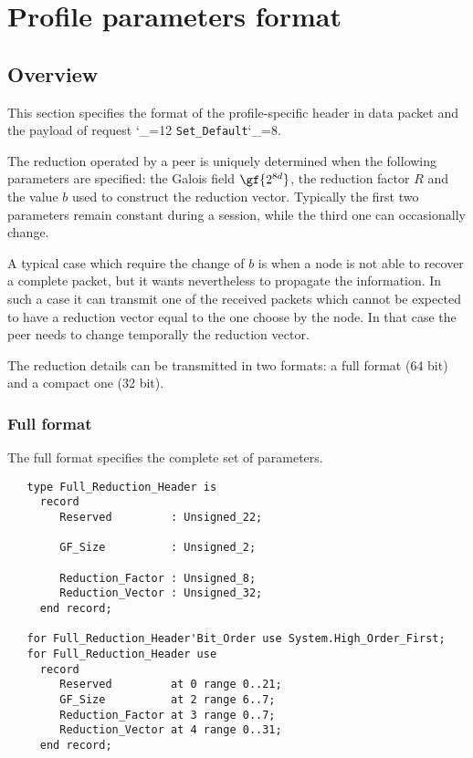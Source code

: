 \documentclass{rfc}
\def\ttt{\catcode`\_=12 \tttii}
\def\tttii#1!{{\tt #1}\catcode`\_=8{}}
\begin{document}
\section{Profile parameters format}
\label{subsub:0.1.1.1;driver}

\subsection{Overview}
\label{sub:0.1.1.1.0;transport_layer}

This section specifies the format of the profile-specific header in
data packet and the payload of request \ttt Set_Default!.

The reduction operated by a peer is uniquely determined when the
following parameters are specified: the Galois field $\gf{2^{8d}}$,
the reduction factor $R$ and the value $b$ used to construct the
reduction vector.  Typically the first two parameters remain constant
during a session, while the third one can occasionally change.

\begin{example}
A typical case which require the change of $b$ is when a node is not
able to recover a complete packet, but it wants nevertheless to
propagate the information.  In such a case it can transmit one of the
received packets which cannot be expected to have a reduction vector
equal to the one choose by the node.  In that case the peer needs to
change temporally the reduction vector.
\end{example}
%
The reduction details can be transmitted in two formats: a full format
(64 bit) and a compact one (32 bit).  

\subsubsection{Full format} The full format specifies the complete set of
parameters. 

\begin{verbatim}
   type Full_Reduction_Header is
     record
        Reserved         : Unsigned_22;

        GF_Size          : Unsigned_2;

        Reduction_Factor : Unsigned_8;
        Reduction_Vector : Unsigned_32;
     end record;

   for Full_Reduction_Header'Bit_Order use System.High_Order_First;
   for Full_Reduction_Header use
     record
        Reserved         at 0 range 0..21;
        GF_Size          at 2 range 6..7;
        Reduction_Factor at 3 range 0..7;
        Reduction_Vector at 4 range 0..31;
     end record;
\end{verbatim}
\end{document}
